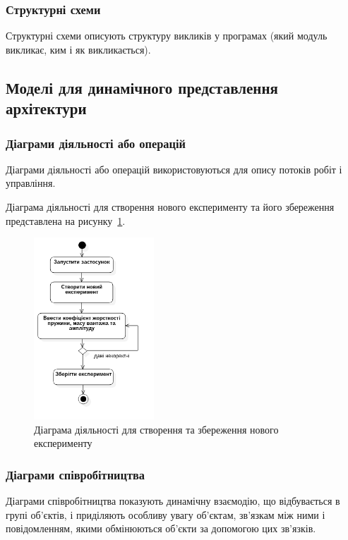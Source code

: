 \subsubsection{Структурні схеми}
Структурні схеми описують структуру викликів у програмах (який модуль викликає, ким і як викликається).

\subsection{Моделі для динамічного представлення архітектури}
\subsubsection{Діаграми діяльності або операцій}
Діаграми діяльності або операцій використовуються для опису потоків робіт і управління.

Діаграма діяльності для створення нового експерименту та його збереження представлена на рисунку~\ref{fig:uml_activity_experiment}.

\begin{figure}[H]
  \centering
    \includegraphics[width=0.4\textwidth]{uml_activity_experiment}
  \caption{Діаграма діяльності для створення та збереження нового експерименту}
  \label{fig:uml_activity_experiment}
\end{figure}

\subsubsection{Діаграми співробітництва}
Діаграми співробітництва показують динамічну взаємодію, що відбувається в групі об'єктів, і приділяють особливу увагу об'єктам, зв'язкам між ними і повідомленням, якими обмінюються об'єкти за допомогою цих зв'язків.

